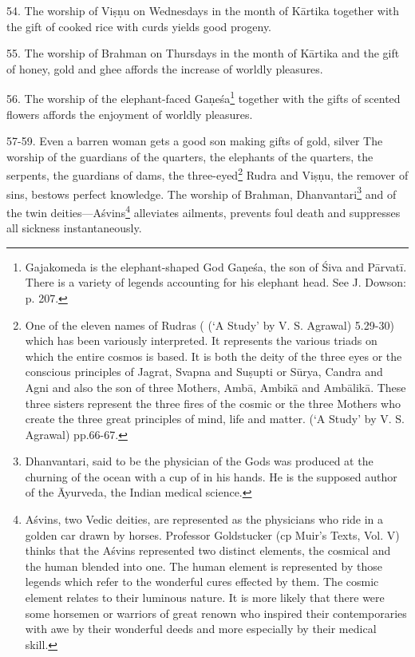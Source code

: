 54. The worship of Viṣṇu on Wednesdays in the month of Kārtika together with
the gift of cooked rice with curds yields good progeny.

55. The worship of Brahman on Thursdays in the month of Kārtika and the gift of
honey, gold and ghee affords the increase of worldly pleasures.

56. The worship of the elephant-faced Gaṇeśa\footnote{Gajakomeda is
the elephant-shaped God Gaṇeśa, the son of Śiva and Pārvatī. There is a variety
of legends accounting for his elephant head. See J. Dowson: 
p. 207.} together with the gifts of scented flowers affords the enjoyment of
worldly pleasures.

57-59. Even a barren woman gets a good son making gifts of gold, silver \etc
The worship of the guardians of the quarters, the elephants of the quarters,
the serpents, the guardians of dams, the three-eyed\footnote{One of the eleven
names of Rudras ( (‘A Study’ by V. S. Agrawal) 5.29-30) which
has been variously interpreted. It represents the various triads on which
the entire cosmos is based. It is both the deity of the three eyes or
the conscious principles of Jagrat, Svapna and Suṣupti or Sūrya, Candra and Agni
and also the son of three Mothers, Ambā, Ambikā and Ambālikā. These three
sisters represent the three fires of the cosmic  or the three Mothers
who create the three great principles of mind, life and matter.
 (‘A Study’ by V. S. Agrawal) pp.66-67.} Rudra and Viṣṇu,
the remover of sins, bestows perfect knowledge. The worship of Brahman,
Dhanvantari\footnote{Dhanvantari, said to be the physician of the Gods was
produced at the churning of the ocean with a cup of  in his hands.
He is the supposed author of the Āyurveda, the Indian medical science.} and of
the twin deities—Aśvins\footnote{Aśvins, two Vedic deities, are represented as
the physicians who ride in a golden car drawn by horses. Professor Goldstucker
(cp Muir’s Texts, Vol. V) thinks that the Aśvins represented two distinct
elements, the cosmical and the human blended into one. The human element is
represented by those legends which refer to the wonderful cures effected by them.
The cosmic element relates to their luminous nature. It is more likely that
there were some horsemen or warriors of great renown who inspired their
contemporaries with awe by their wonderful deeds and more especially by their
medical skill.} alleviates ailments, prevents foul death and suppresses all
sickness instantaneously.

